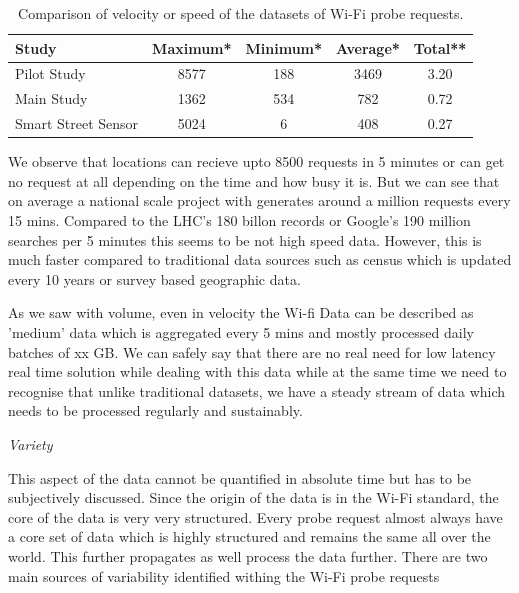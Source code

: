\begin{table}[h]
  \footnotesize
  \begin{center}
    \begin{tabular}{lcccc}
      \toprule
      Study & Maximum* & Minimum* & Average* & Total** \\
      \midrule
      Pilot Study & 8577 & 188 & 3469 & 3.20 \\
      Main Study & 1362 & 534 & 782 & 0.72 \\
      Smart Street Sensor & 5024 & 6 & 408 & 0.27 \\
      \bottomrule
    \end{tabular}
  \end{center}
  \caption{Comparison of velocity or speed of the datasets of Wi-Fi probe requests.}
  \label{table:toolkit:velocity}
\end{table}


We observe that locations can recieve upto 8500 requests in 5 minutes or can get no request at all depending on the time and how busy it is.
But we can see that on average a national scale project with generates around a million requests every 15 mins. 
Compared to the LHC's 180 billon records or Google's 190 million searches per 5 minutes this seems to be not high speed data.
However, this is much faster compared to traditional data sources such as census which is updated every 10 years or survey based geographic data.


As we saw with volume, even in velocity the Wi-fi Data can be described as 'medium' data which is aggregated every 5 mins and mostly processed daily batches of xx GB.
We can safely say that there are no real need for low latency real time solution while dealing with this data while at the same time we need to recognise that unlike traditional datasets, we have a steady stream of data which needs to be processed regularly and sustainably.

\vspace{1.5em}\noindent\textit{Variety}\vspace{0.5em}

This aspect of the data cannot be quantified in absolute time but has to be subjectively discussed.
Since the origin of the data is in the Wi-Fi standard, the core of the data is very very structured.
Every probe request almost always have a core set of data which is highly structured and remains the same all over the world.
This further propagates as well process the data further.
There are two main sources of variability identified withing the Wi-Fi probe requests

